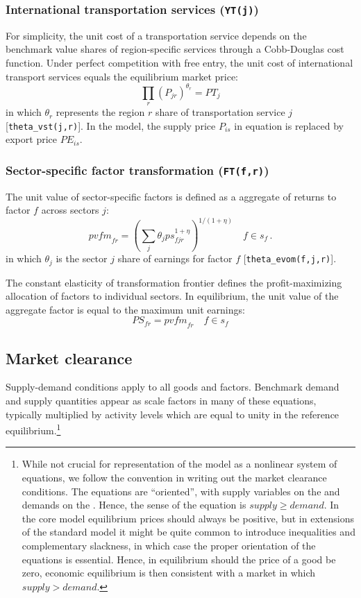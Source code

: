 \subsubsection[Transportation]{International transportation services
(\texttt{YT(j)})}

For simplicity, the unit cost of a transportation service depends on
the benchmark value shares of region-specific services through a
Cobb-Douglas cost function. Under perfect competition with free entry,
the unit cost of international transport services equals the
equilibrium market price:
\begin{equation}
\prod_r (P_{jr})^{\theta_r} = \mathit{PT}_j
\end{equation}
in which $\theta_r$ represents the region $r$ share of transportation
service $j$ [{\small \texttt{theta\_vst(j,r)}}].
In the \SOE model, the supply price $P_{is}$ in equation is replaced
by export price $\mathit{PE}_{is}$.

\subsubsection[Sector-specific factors]{Sector-specific factor transformation (\texttt{FT(f,r)})}

The unit value of sector-specific factors is defined as a \CET
aggregate of returns to factor $f$ across sectors $j$:
$$\textit{pvfm}_{fr} = \left( \sum_j \theta_j ps_{fjr}^{1+\eta}
\right)^{1/(1+\eta)} \quad f \in s_{f}\,.$$
in which $\theta_j$ is the sector $j$ share of earnings for factor
$f$ [{\small \texttt{theta\_evom(f,j,r)}}].

The constant elasticity of transformation frontier defines the
profit-maximizing allocation of factors to individual sectors. In
equilibrium, the unit value of the aggregate factor is equal to the
maximum unit earnings:
\begin{equation}
\mathit{PS}_{fr} = \textit{pvfm}_{fr} \quad f \in s_f
\end{equation}

\subsection{Market clearance}

Supply-demand conditions apply to all goods and factors. Benchmark
demand and supply quantities appear as scale factors in many of these
equations, typically multiplied by activity levels which are equal to
unity in the reference equilibrium.\footnote{While not crucial for
representation of the model as a nonlinear system of equations, we
follow the \MCP convention in writing out the market clearance
conditions. The equations are ``oriented'', with supply variables on
the \LHS and demands on the \RHS. Hence, the sense of the equation is
$supply \geq demand$. In the core model equilibrium prices should
always be positive, but in extensions of the standard model it might
be quite common to introduce inequalities and complementary slackness,
in which case the proper orientation of the equations is essential.
Hence, in equilibrium should the price of a good be zero, economic
equilibrium is then consistent with a market in which $supply >
demand$.}

